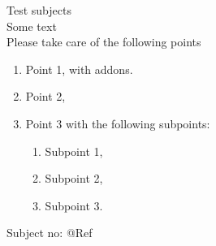 \documentclass{article}%
\begin{document}
Test subjects\\

Some text\\
Please take care of the following points
\begin{enumerate}
\item Point 1,
with addons.
\item Point 2,
\item Point 3 with the following subpoints:
	\begin{enumerate}
	\item Subpoint 1, %
	\item Subpoint 2,
	\item Subpoint 3.
\end{enumerate}
\end{enumerate}

Subject no: @Ref
\end{document}
